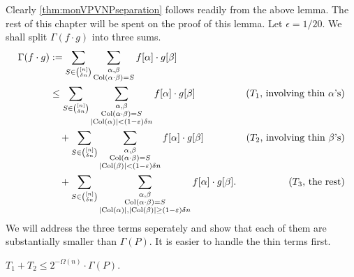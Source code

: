 Clearly \autoref{thm:monVPVNPseparation} follows readily from the above lemma. The rest of this chapter will be spent on the proof of this lemma. Let $\epsilon = 1/20$. We shall split $\Gamma(f \cdot g)$ into three sums.
\begin{align*}
  \Gamma(f \cdot g) & :=   \sum_{S \in \binom{[n]}{\delta n}} \sum_{\substack{\alpha, \beta\\ \operatorname{Col}(\alpha \cdot \beta) = S}} f[\alpha] \cdot g[\beta]\\
                    & \leq \sum_{S \in \binom{[n]}{\delta n}} \sum_{\substack{\alpha, \beta\\ \operatorname{Col}(\alpha \cdot \beta) = S \\ \left|\operatorname{Col}(\alpha)\right| < (1-\varepsilon)\delta n}} f[\alpha] \cdot g[\beta] & \text{($T_1$, involving thin $\alpha$'s)}\\
                    & \quad + \sum_{S \in \binom{[n]}{\delta n}} \sum_{\substack{\alpha, \beta\\ \operatorname{Col}(\alpha \cdot \beta) = S \\ \left|\operatorname{Col}(\beta)\right| < (1-\varepsilon)\delta n}} f[\alpha] \cdot g[\beta] & \text{($T_2$, involving thin $\beta$'s)}\\
                    & \quad + \sum_{S \in \binom{[n]}{\delta n}} \sum_{\substack{\alpha, \beta\\ \operatorname{Col}(\alpha \cdot \beta) = S \\ \left|\operatorname{Col}(\alpha)\right|,\left|\operatorname{Col}(\beta)\right| \geq (1-\varepsilon)\delta n}} f[\alpha] \cdot g[\beta]. & \text{($T_3$, the rest)}                                                           
\end{align*}
We will address the three terms seperately and show that each of them are substantially smaller than $\Gamma(P)$. It is easier to handle the thin terms first.
\begin{claim}
  $T_1 + T_2 \leq 2^{-\Omega(n)} \cdot \Gamma(P)$. 
\end{claim}
